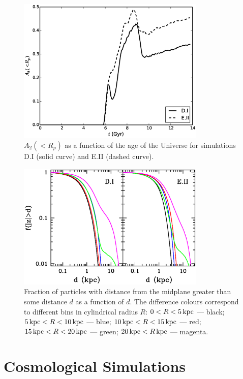 \begin{figure}
	\centering
	\includegraphics[width=0.8\textwidth]{../figures/cosmo_a2_vs_t_2rd_weighted.eps}
	\caption{$A_2(<R_p)$ as a function of the age of the Universe
          for simulations D.I (solid curve) and E.II (dashed
          curve). } \label{fig:cosmo_a2_vs_t}
\end{figure}


\begin{figure}
	\centering
	\includegraphics[width=0.8\textwidth]{../figures/kicked_up_disk.eps}
	\caption{Fraction of particles with distance from the midplane greater
than some distance $d$ as a function of $d$.  The difference colours correspond to
different bins in cylindrical radius $R$: $0<R<5\,{\rm kpc}$ --- black;
$5\,{\rm kpc} < R < 10\,{\rm kpc}$ --- blue;
$10\,{\rm kpc} < R < 15\,{\rm kpc}$ --- red;
$15\,{\rm kpc} < R < 20\,{\rm kpc}$ --- green;
$20\,{\rm kpc} < R\,{\rm kpc}$ --- magenta.}
 \label{fig:kicked_up_disc}
\end{figure}

\section{Cosmological Simulations} \label{sec:cosmo}

